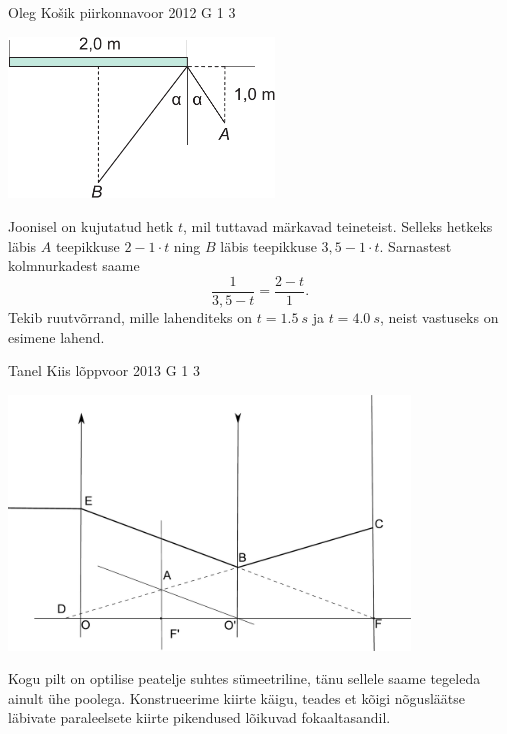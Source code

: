 \documentclass[11pt, twoside]{article}
\begin{document}
{%
{Oleg Košik} %
{piirkonnavoor} %
{2012} %
{G 1} %
{3} %
{

\ifSolution
\begin{center}
\includegraphics[width=200pt]{2012-v2g-01-peegel_lah}
\end{center}

Joonisel on kujutatud hetk $t$, mil tuttavad märkavad teineteist. Selleks hetkeks läbis $A$ teepikkuse $2-1\cdot t$ ning $B$ läbis teepikkuse $3,5-1\cdot t$. Sarnastest kolmnurkadest saame
\[
\frac{1}{3,5-t}=\frac{2-t}{1}.
\]
Tekib ruutvõrrand, mille lahenditeks on $t=\SI{1,5}{s}$ ja $t=\SI{4,0}{s}$, neist vastuseks on esimene lahend.
\fi
}

{Tanel Kiis} %
{lõppvoor} %
{2013} %
{G 1} %
{3} %
{

\ifSolution
\begin{center}
	\includegraphics[width=0.8\textwidth]{2013-v3g-01-laats_lah2}\\
\end{center}
Kogu pilt on optilise peatelje suhtes sümeetriline, tänu sellele saame tegeleda ainult ühe poolega. Konstrueerime kiirte käigu, teades et kõigi nõgusläätse läbivate paraleelsete kiirte pikendused lõikuvad fokaaltasandil. 

}}
\end{document}
